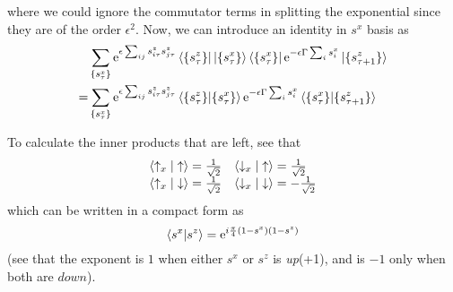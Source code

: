 \documentclass[11pt]{article}
\newcommand{\e}{\mathrm{e}}
\numberwithin{equation}{section}
\begin{document}
where we could ignore the commutator terms in splitting the exponential since they are of the order \(\epsilon^2\). Now, we can introduce an identity in \(s^x\) basis as 
\begin{align*}
    &\sum_{\{s_\tau^x\}} \e^{\epsilon \sum_{ij} s^z_{i\tau}s^z_{j\tau}} \bra{\{s_\tau^z\}}\ket{\{s_\tau^x\}}\bra{\{s_\tau^x\}} \e^{-\epsilon \Gamma\sum_i s^x_i} \ket{\{s_{\tau+1}^z\}}\\
    =& \sum_{\{s_\tau^x\}} \e^{\epsilon \sum_{ij} s^z_{i\tau}s^z_{j\tau}} \braket{\{s_\tau^z\} | \{s_\tau^x\}}\e^{-\epsilon \Gamma\sum_i s^x_i} \braket{\{s_\tau^x\} | \{s_{\tau+1}^z\}}
\end{align*}

To calculate the inner products that are left, see that 
\begin{equation*}
    \begin{array}{ll}
        \braket{\uparrow_x|\uparrow} =\frac{1}{\sqrt{2}}& \braket{\downarrow_x|\uparrow} =\frac{1}{\sqrt{2}}\\
        \braket{\uparrow_x|\downarrow}=\frac{1}{\sqrt{2}} & \braket{\downarrow_x|\downarrow}  = -\frac{1}{\sqrt{2}}
    \end{array}
\end{equation*}
which can be written in a compact form as 
\begin{equation*}
    \braket{s^x | s^z} =  \e^{i\frac{\pi}{4} (1-s^x)(1-s^z)}
\end{equation*}
(see that the exponent is \(1\) when either \(s^x\) or \(s^z\) is \textit{up}(+1), and is \(-1\) only when both are \(down\)).\\
\end{document}
